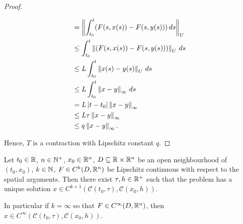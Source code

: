 \begin{proof}
\begin{itemize}
\begin{equation}
\begin{split}
          & = \left\lVert\int_{t_0}^t (F(s, x(s)) - F(s, y(s)))\, d s\right\rVert_U \\
          & \leq \int_{t_0}^t \left\lVert(F(s, x(s)) - F(s, y(s)))\right\rVert_U\, d s \\
          & \leq L \int_{t_0}^t \left\lVert x(s) - y(s)\right\rVert_U\, d s \\
          & \leq L \int_{t_0}^t \left\lVert x - y\right\rVert_\infty\, d s \\
          & = L \left\lvert t - t_0\right\rvert \left\lVert x - y\right\rVert_\infty \\
          & \leq L \tau \left\lVert x - y\right\rVert_\infty \\
          & \leq q \left\lVert x - y\right\rVert_\infty.
        \end{split}
      \end{equation}
  \end{itemize}
  Hence, $T$ is a contraction with Lipschitz constant $q$.
\end{proof}
\begin{theorem}
  Let
    $t_0 \in \mathbb{R}$,
    $n \in \mathbb{N}^+$,
    $x_0 \in \mathbb{R}^n$,
    $D \subseteq \mathbb{R} \times \mathbb{R}^n$ be an open neighbourhood of $(t_0, x_0)$,
    $k \in \mathbb{N}$,
    $F \in C^k(D, \mathbb{R}^n)$ be
      Lipschitz continuous with respect to the spatial arguments.
  Then there exist $\tau, h \in \mathbb{R}^+$ such that the problem
  has a unique solution
  $x \in C^{k + 1}(\mathcal{C}(t_0, \tau), \mathcal{C}(x_0, h))$.

  In particular if $k = \infty$ so that $F \in C^\infty(D, \mathbb{R}^n)$, then
  $x \in C^\infty(\mathcal{C}(t_0, \tau), \mathcal{C}(x_0, h))$.
\end{theorem}
